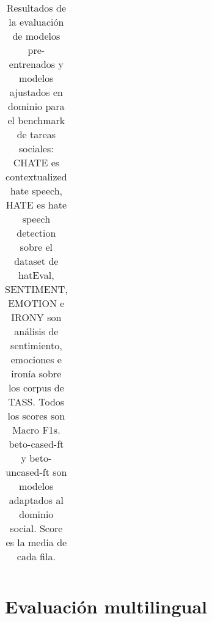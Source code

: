 \begin{table}
\begin{tabular}{llllllr}
        \bottomrule
    \end{tabular}
    \caption{Resultados de la evaluación de modelos pre-entrenados y modelos ajustados en dominio para el benchmark de tareas sociales: CHATE es contextualized hate speech, HATE es hate speech detection sobre el dataset de hatEval, SENTIMENT, EMOTION e IRONY son análisis de sentimiento, emociones e ironía sobre los corpus de TASS. Todos los scores son Macro F1s. beto-cased-ft y beto-uncased-ft son modelos adaptados al dominio social. Score es la media de cada fila.}

    \label{tab:full_domain_adaptation_evaluation_results}

\end{table}

\section{Evaluación multilingual}

